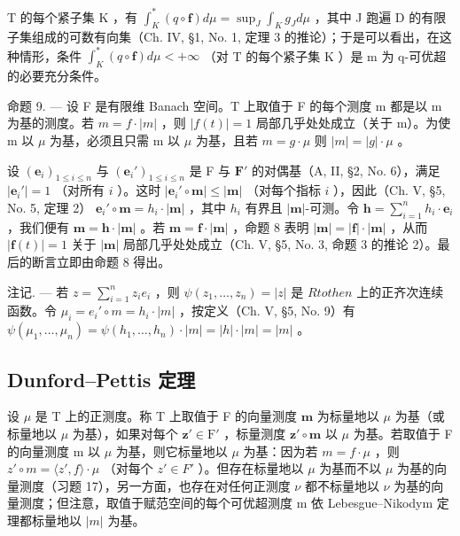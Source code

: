 T 的每个紧子集 K ，有 \(\int_{K}^{*}(q\circ\mathbf{f})d\mu=\sup_{J}\int_{K}g_{J}d\mu\) ，其中 J 跑遍 D 的有限子集组成的可数有向集（Ch. IV, §1, No. 1, 定理 3 的推论）；于是可以看出，在这种情形，条件 \(\int_{K}^{*}(q\circ\mathbf{f})d\mu<+\infty\) （对 T 的每个紧子集 K ）是 m 为 q-可优超的必要充分条件。

命题 9. --- 设 F 是有限维 Banach 空间。T 上取值于 F 的每个测度 m 都是以 \textbar m\textbar 为基的测度。若 \(m = f \cdot |m|\) ，则 \(|f(t)| = 1\) 局部几乎处处成立（关于 \textbar m\textbar ）。为使 m 以 \(\mu\) 为基，必须且只需 \textbar m\textbar{} 以 \(\mu\) 为基，且若 \(m = g \cdot \mu\) 则 \(|m| = |g| \cdot \mu\) 。

设 \((\mathbf{e}_i)_{1 \leqslant i \leqslant n}\) 与 \((\mathbf{e}_i')_{1 \leqslant i \leqslant n}\) 是 F 与 \(\mathbf{F}'\) 的对偶基（A, II, §2, No. 6），满足 \(|\mathbf{e}_i'| = 1\) （对所有 \(i\) ）。这时 \(|\mathbf{e}_i' \circ \mathbf{m}| \leqslant |\mathbf{m}|\) （对每个指标 \(i\) ），因此（Ch. V, §5, No. 5, 定理 2） \(\mathbf{e}_i' \circ \mathbf{m} = h_i \cdot |\mathbf{m}|\) ，其中 \(h_i\) 有界且 \(|\mathbf{m}|\)-可测。令 \(\mathbf{h} = \sum_{i=1}^{n} h_i \cdot \mathbf{e}_i\) ，我们便有 \(\mathbf{m} = \mathbf{h} \cdot |\mathbf{m}|\) 。若 \(\mathbf{m} = \mathbf{f} \cdot |\mathbf{m}|\) ，命题 8 表明 \(|\mathbf{m}| = |\mathbf{f}| \cdot |\mathbf{m}|\) ，从而 \(|\mathbf{f}(t)| = 1\) 关于 \(|\mathbf{m}|\) 局部几乎处处成立（Ch. V, §5, No. 3, 命题 3 的推论 2）。最后的断言立即由命题 8 得出。

注记. --- 若 \(z = \sum_{i=1}^{n} z_i e_i\) ，则 \(\psi(z_1, \ldots, z_n) = |z|\) 是 \(R to the n\) 上的正齐次连续函数。令 \(\mu_i = e_i' \circ m = h_i \cdot |m|\) ，按定义（Ch. V, §5, No. 9）有 \(\psi(\mu_1, \ldots, \mu_n) = \psi(h_1, \ldots, h_n) \cdot |m| = |h| \cdot |m| = |m|\) 。

\subsection{Dunford--Pettis 定理}

设 \(\mu\) 是 T 上的正测度。称 T 上取值于 F 的向量测度 \(\mathbf{m}\) 为标量地以 \(\mu\) 为基（或标量地以 \(\mu\) 为基），如果对每个 \(\mathbf{z}' \in \mathrm{F}'\) ，标量测度 \(\mathbf{z}' \circ \mathbf{m}\) 以 \(\mu\) 为基。若取值于 F 的向量测度 m 以 \(\mu\) 为基，则它标量地以 \(\mu\) 为基：因为若 \(m = f \cdot \mu\) ，则 \(z' \circ m = \langle z', f \rangle \cdot \mu\) （对每个 \(z' \in F'\) ）。但存在标量地以 \(\mu\) 为基而不以 \(\mu\) 为基的向量测度（习题 17），另一方面，也存在对任何正测度 \(\nu\) 都不标量地以 \(\nu\) 为基的向量测度；但注意，取值于赋范空间的每个可优超测度 m 依 Lebesgue--Nikodym 定理都标量地以 \(|m|\) 为基。

